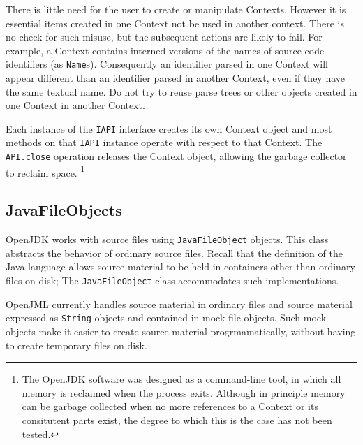 \documentclass{report}%
\begin{document}
There is little need for the user to create or manipulate
Contexts. However it is essential items created in one Context not be used in another context. There is no check for such misuse, but the subsequent actions are likely to fail. For example, a Context contains interned versions of the names of
source code identifiers (as {\tt Name}s). Consequently an identifier parsed in one Context will 
appear different than an identifier
parsed in another Context, even if they have the same textual name. Do not try to reuse parse trees or other objects 
created in one Context in another Context.
 
Each instance of the {\tt IAPI} interface creates its own Context object and most methods on 
that {\tt IAPI} instance operate with respect to that Context. The {\tt API.close} operation 
releases the Context object, allowing the garbage collector to reclaim space.
\footnote{The OpenJDK software was designed as a command-line tool, in which all memory is reclaimed
when the process exits. Although in principle memory can be garbage collected when no more references
to a Context or its consitutent parts exist, the degree to which this is the case has not been tested.}

\label{JavaFileObjects}
\subsection{JavaFileObjects}

OpenJDK works with source files using {\tt JavaFileObject} objects. This class abstracts the behavior of 
ordinary source files. Recall that the definition of the Java language allows source material to be held 
in containers other than ordinary files on disk; The {\tt JavaFileObject} class accommodates such implementations.

OpenJML currently handles source material in ordinary files and source material expressed as {\tt String} objects
and contained in mock-file objects. Such mock objects make it easier to create source material progrmamatically, 
without having to create temporary files on disk.
\end{document}
